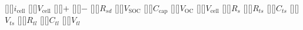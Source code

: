 [][]{$i_\text{cell}$}
[][]{$V_\text{cell}$}
\psfrag{+}[][]{$+$}
\psfrag{-}[][]{$-$}
[][]{$R_{sd}$}
[][]{$V_\text{SOC}$}
[][]{$C_\text{cap}$}
[][]{$V_\text{OC}$}
[][]{$V_\text{cell}$}
[][]{$R_s$}
[][]{$R_{ts}$}
[][]{$C_{ts}$}
[][]{$V_{ts}$}
[][]{$R_{tl}$}
[][]{$C_{tl}$}
[][]{$V_{tl}$}

\centering
